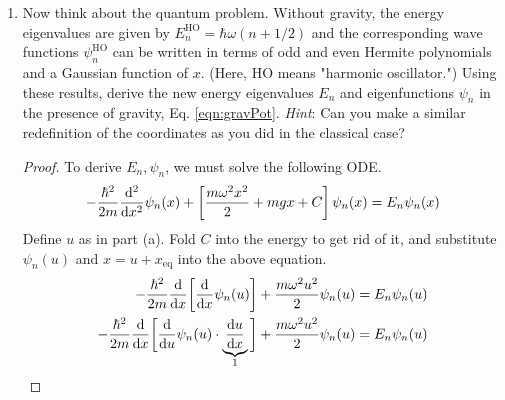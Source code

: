 \documentclass[../psets.tex]{subfiles}
\begin{document}
\begin{enumerate}
\begin{enumerate}
\begin{proof}
            Then $x=u+x_\text{eq}$, so
            \begin{align*}
                V(u) &= \frac{m\omega^2(u+x_\text{eq})^2}{2}+mg(u+x_\text{eq})+C\\
                &= \frac{m\omega^2u^2}{2}+m\omega^2x_\text{eq}u+mgu+\frac{m\omega^2x_\text{eq}^2}{2}+mgx_\text{eq}+C\\
                V(u) &= \frac{m\omega^2u^2}{2}+m\omega^2\left( -\frac{g}{\omega^2} \right)u+mgu+C\\
                \Aboxed{V(u) &= \frac{m\omega^2u^2}{2}+C}
            \end{align*}
            Note that we combine all constants from the second to the third line above, which we may do because only relative --- not absolute --- values of the potential matter.\par
            This result reveals that the motion of a classical particle under the potential given in Eq. \ref{eqn:gravPot} is 
        \end{proof}
        \pagebreak
        \item Now think about the quantum problem. Without gravity, the energy eigenvalues are given by $E_n^\text{HO}=\hbar\omega(n+1/2)$ and the corresponding wave functions $\psi_n^\text{HO}$ can be written in terms of odd and even Hermite polynomials and a Gaussian function of $x$. (Here, HO means "harmonic oscillator.") Using these results, derive the new energy eigenvalues $E_n$ and eigenfunctions $\psi_n$ in the presence of gravity, Eq. \ref{eqn:gravPot}. \emph{Hint}: Can you make a similar redefinition of the coordinates as you did in the classical case?
        \begin{proof}
            To derive $E_n,\psi_n$, we must solve the following ODE.
            \begin{equation*}
                -\frac{\hbar^2}{2m}\dv[2]{x}\psi_n(x)+\left[ \frac{m\omega^2x^2}{2}+mgx+C \right]\psi_n(x) = E_n\psi_n(x)
            \end{equation*}
            Define $u$ as in part (a). Fold $C$ into the energy to get rid of it, and substitute $\psi_n(u)$ and $x=u+x_\text{eq}$ into the above equation.
            \begin{align*}
                -\frac{\hbar^2}{2m}\dv{x}\bigg[ \dv{x}\psi_n(u) \bigg]+\frac{m\omega^2u^2}{2}\psi_n(u) &= E_n\psi_n(u)\\
                -\frac{\hbar^2}{2m}\dv{x}\bigg[ \dv{u}\psi_n(u)\cdot\underbrace{\dv{u}{x}}_1 \bigg]+\frac{m\omega^2u^2}{2}\psi_n(u) &= E_n\psi_n(u)\\

\end{align*}
\end{proof}
\end{enumerate}
\end{enumerate}
\end{document}
